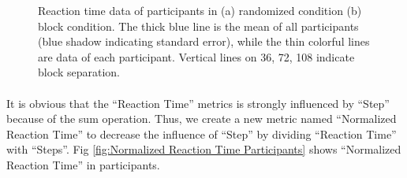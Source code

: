 \begin{figure}[ht]
{\begin{minipage}[t]{0.48\textwidth}
\end{minipage}
}
\decoRule
\caption[Reaction time data of participants]{Reaction time data of participants in (a) randomized condition (b) block condition. The thick blue line is the mean of all participants (blue shadow indicating standard error), while the thin colorful lines are data of each participant. Vertical lines on 36, 72, 108 indicate block separation. }
\label{fig:Reaction Time Participants}
\end{figure}

\paragraph{}
It is obvious that the \enquote{Reaction Time} metrics is strongly influenced by \enquote{Step} because of the sum operation. Thus, we create a new metric named \enquote{Normalized Reaction Time} to decrease the influence of \enquote{Step} by dividing \enquote{Reaction Time} with \enquote{Steps}. Fig \ref{fig:Normalized Reaction Time Participants} shows \enquote{Normalized Reaction Time} in participants. 


